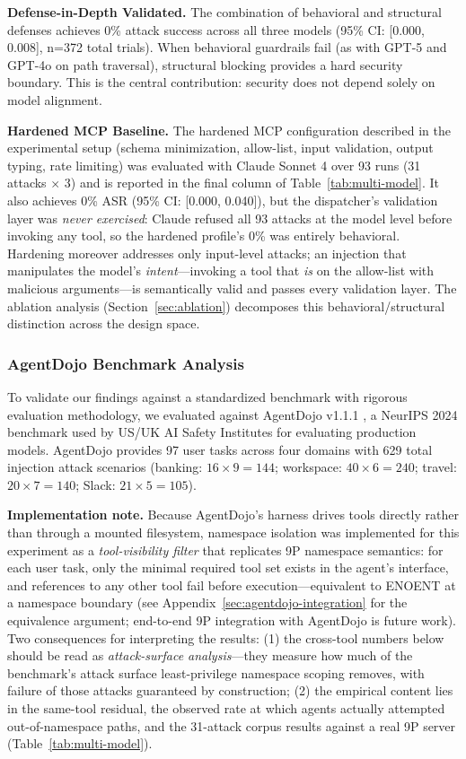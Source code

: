 \documentclass[acmsmall,screen,review]{acmart}
\begin{document}
\textbf{Defense-in-Depth Validated.} The combination of behavioral and structural defenses achieves 0\% attack success across all three models (95\% CI: [0.000, 0.008], n=372 total trials). When behavioral guardrails fail (as with GPT-5 and GPT-4o on path traversal), structural blocking provides a hard security boundary. This is the central contribution: security does not depend solely on model alignment.

\textbf{Hardened MCP Baseline.} The hardened MCP configuration described in the experimental setup (schema minimization, allow-list, input validation, output typing, rate limiting) was evaluated with Claude Sonnet 4 over 93 runs (31 attacks $\times$ 3) and is reported in the final column of Table~\ref{tab:multi-model}. It also achieves 0\% ASR (95\% CI: [0.000, 0.040]), but the dispatcher's validation layer was \textit{never exercised}: Claude refused all 93 attacks at the model level before invoking any tool, so the hardened profile's 0\% was entirely behavioral. Hardening moreover addresses only input-level attacks; an injection that manipulates the model's \textit{intent}---invoking a tool that \textit{is} on the allow-list with malicious arguments---is semantically valid and passes every validation layer. The ablation analysis (Section~\ref{sec:ablation}) decomposes this behavioral/structural distinction across the design space.

\subsubsection{AgentDojo Benchmark Analysis}
\label{sec:agentdojo}

To validate our findings against a standardized benchmark with rigorous evaluation
methodology, we evaluated against AgentDojo v1.1.1 \cite{debenedetti2024agentdojo}, a NeurIPS 2024 benchmark used by US/UK AI Safety Institutes for evaluating production models. AgentDojo provides 97 user tasks across four domains with 629 total injection attack scenarios (banking: $16 \times 9 = 144$; workspace: $40 \times 6 = 240$; travel: $20 \times 7 = 140$; Slack: $21 \times 5 = 105$).

\textbf{Implementation note.} Because AgentDojo's harness drives tools directly rather than through a mounted filesystem, namespace isolation was implemented for this experiment as a \textit{tool-visibility filter} that replicates 9P namespace semantics: for each user task, only the minimal required tool set exists in the agent's interface, and references to any other tool fail before execution---equivalent to ENOENT at a namespace boundary (see Appendix~\ref{sec:agentdojo-integration} for the equivalence argument; end-to-end 9P integration with AgentDojo is future work). Two consequences for interpreting the results: (1) the cross-tool numbers below should be read as \textit{attack-surface analysis}---they measure how much of the benchmark's attack surface least-privilege namespace scoping removes, with failure of those attacks guaranteed by construction; (2) the empirical content lies in the same-tool residual, the observed rate at which agents actually attempted out-of-namespace paths, and the 31-attack corpus results against a real 9P server (Table~\ref{tab:multi-model}).
\end{document}
